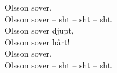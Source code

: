 
            Olsson sover, \\
            Olsson sover – sht – sht – sht. \\
            Olsson sover djupt, \\
            Olsson sover hårt! \\
            Olsson sover, \\
            Olsson sover – sht – sht – sht. \\
